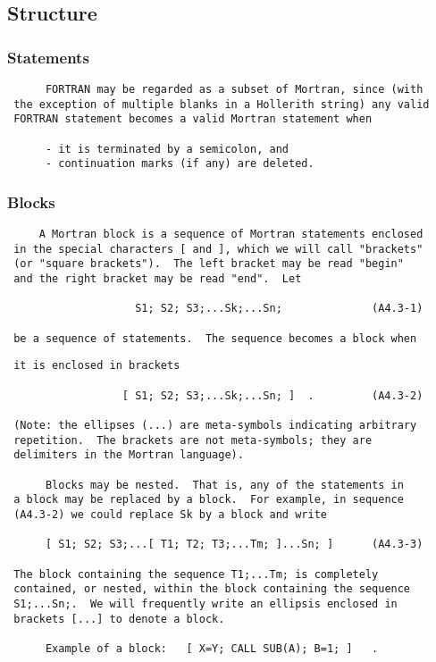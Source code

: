  \subsection{Structure}
 \subsubsection{Statements}
 \begin{verbatim}
      FORTRAN may be regarded as a subset of Mortran, since (with
 the exception of multiple blanks in a Hollerith string) any valid
 FORTRAN statement becomes a valid Mortran statement when

      - it is terminated by a semicolon, and
      - continuation marks (if any) are deleted.

 \end{verbatim}
 \subsubsection{Blocks}
 \begin{verbatim}
     A Mortran block is a sequence of Mortran statements enclosed
 in the special characters [ and ], which we will call "brackets"
 (or "square brackets").  The left bracket may be read "begin"
 and the right bracket may be read "end".  Let

                    S1; S2; S3;...Sk;...Sn;              (A4.3-1)

 be a sequence of statements.  The sequence becomes a block when
\end{verbatim}
\newpage \begin{verbatim}
 it is enclosed in brackets

                  [ S1; S2; S3;...Sk;...Sn; ]  .         (A4.3-2)

 (Note: the ellipses (...) are meta-symbols indicating arbitrary
 repetition.  The brackets are not meta-symbols; they are
 delimiters in the Mortran language).

      Blocks may be nested.  That is, any of the statements in
 a block may be replaced by a block.  For example, in sequence
 (A4.3-2) we could replace Sk by a block and write

      [ S1; S2; S3;...[ T1; T2; T3;...Tm; ]...Sn; ]      (A4.3-3)

 The block containing the sequence T1;...Tm; is completely
 contained, or nested, within the block containing the sequence
 S1;...Sn;.  We will frequently write an ellipsis enclosed in
 brackets [...] to denote a block.

      Example of a block:   [ X=Y; CALL SUB(A); B=1; ]   .

 \end{verbatim}
